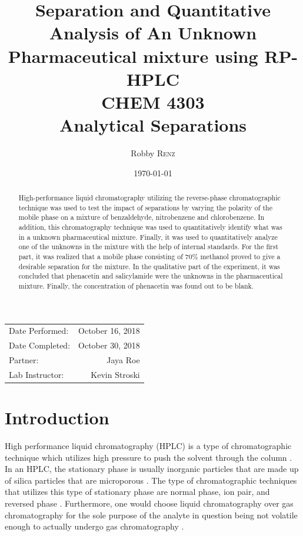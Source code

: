 \documentclass[a4paper, 12pt]{article}
\title{Separation and Quantitative Analysis of An Unknown Pharmaceutical mixture using RP-HPLC \\ CHEM 4303 \\ Analytical Separations} %
\author{Robby \textsc{Renz}} %
\date{\today} %
\begin{document}
\maketitle %

\begin{center}
\begin{tabular}{l r}
Date Performed: & October 16, 2018 \\ %
Date Completed: & October 30, 2018 \\
Partner: & Jaya Roe \\ %
Lab Instructor: & Kevin Stroski %
\end{tabular}
\end{center}


\begin{abstract}
	High-performance liquid chromatography utilizing the reverse-phase chromatographic technique was used to test the impact of separations by varying the polarity of the mobile phase on a mixture of benzaldehyde, nitrobenzene and chlorobenzene. In addition, this chromatography technique was used to quantitatively identify what was in a unknown pharmaceutical mixture. Finally, it was used to quantitatively analyze one of the unknowns in the mixture with the help of internal standards. For the first part, it was realized that a mobile phase consisting of $70\%$ methanol proved to give a desirable separation for the mixture. In the qualitative part of the experiment, it was concluded that phenacetin and salicylamide were the unknowns in the pharmaceutical mixture. Finally, the concentration of phenacetin was found out to be blank.
\end{abstract}
\newpage


\section{Introduction}
High performance liquid chromatography (HPLC) is a type of chromatographic technique which utilizes high pressure to push the solvent through the column \cite{harris}. In an HPLC, the stationary phase is usually inorganic particles that are made up of silica particles that are microporous \cite{harris}. The type of chromatographic techniques that utilizes this type of stationary phase are normal phase, ion pair, and reversed phase \cite{mold}. Furthermore, one would choose liquid chromatography over gas chromatography for the sole purpose of the analyte in question being not volatile enough to actually undergo gas chromatography \cite{harris}.
\end{document}
